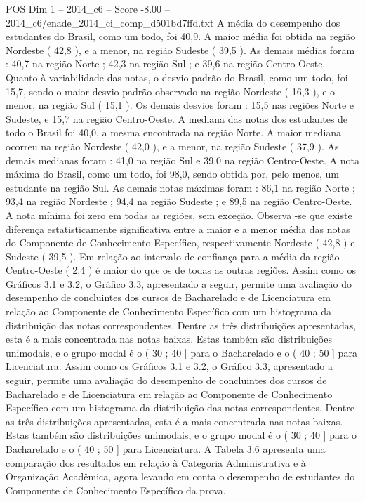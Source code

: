\begin{textsample}{POS Dim 1 – 2014\_c6 – Score -8.00 – 2014\_c6/enade\_2014\_ci\_comp\_d501bd7ffd.txt}
A média do desempenho dos estudantes do Brasil, como um todo, foi 40,9.
A maior média foi obtida na região Nordeste ( 42,8 ), e a menor, na região Sudeste ( 39,5 ).
As demais médias foram : 40,7 na região Norte ; 42,3 na região Sul ; e 39,6 na região Centro-Oeste.
Quanto à variabilidade das notas, o desvio padrão do Brasil, como um todo, foi 15,7, sendo o maior desvio padrão observado na região Nordeste ( 16,3 ), e o menor, na região Sul ( 15,1 ).
Os demais desvios foram : 15,5 nas regiões Norte e Sudeste, e 15,7 na região Centro-Oeste.
A mediana das notas dos estudantes de todo o Brasil foi 40,0, a mesma encontrada na região Norte.
A maior mediana ocorreu na região Nordeste ( 42,0 ), e a menor, na região Sudeste ( 37,9 ).
As demais medianas foram : 41,0 na região Sul e 39,0 na região Centro-Oeste.
A nota máxima do Brasil, como um todo, foi 98,0, sendo obtida por, pelo menos, um estudante na região Sul.
As demais notas máximas foram : 86,1 na região Norte ; 93,4 na região Nordeste ; 94,4 na região Sudeste ; e 89,5 na região Centro-Oeste.
A nota mínima foi zero em todas as regiões, sem exceção.
Observa -se que existe diferença estatisticamente significativa entre a maior e a menor média das notas do Componente de Conhecimento Específico, respectivamente Nordeste ( 42,8 ) e Sudeste ( 39,5 ).
Em relação ao intervalo de confiança para a média da região Centro-Oeste ( 2,4 ) é maior do que os de todas as outras regiões.
Assim como os Gráficos 3.1 e 3.2, o Gráfico 3.3, apresentado a seguir, permite uma avaliação do desempenho de concluintes dos cursos de Bacharelado e de Licenciatura em relação ao Componente de Conhecimento Específico com um histograma da distribuição das notas correspondentes.
Dentre as três distribuições apresentadas, esta é a mais concentrada nas notas baixas.
Estas também são distribuições unimodais, e o grupo modal é o ( 30 ; 40 ] para o Bacharelado e o ( 40 ; 50 ] para Licenciatura.
Assim como os Gráficos 3.1 e 3.2, o Gráfico 3.3, apresentado a seguir, permite uma avaliação do desempenho de concluintes dos cursos de Bacharelado e de Licenciatura em relação ao Componente de Conhecimento Específico com um histograma da distribuição das notas correspondentes.
Dentre as três distribuições apresentadas, esta é a mais concentrada nas notas baixas.
Estas também são distribuições unimodais, e o grupo modal é o ( 30 ; 40 ] para o Bacharelado e o ( 40 ; 50 ] para Licenciatura.
A Tabela 3.6 apresenta uma comparação dos resultados em relação à Categoria Administrativa e à Organização Acadêmica, agora levando em conta o desempenho de estudantes do Componente de Conhecimento Específico da prova.

\end{textsample}
